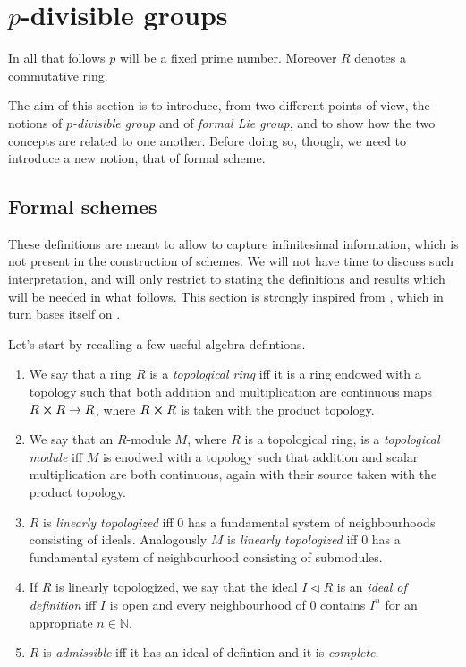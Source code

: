 \documentclass[../Main]{subfiles}
\begin{document}
\section{\texorpdfstring{$p$}{p}-divisible groups}
In all that follows $p$ will be a fixed prime number.
Moreover $R$ denotes a commutative ring.

The aim of this section is to introduce, from two different points of view,
the notions of {\em $p$-divisible group} and of {\em formal Lie group},
and to show how the two concepts are related to one another.
Before doing so, though, we need to introduce a new notion, that
of formal scheme.


\subsection{Formal schemes}
These definitions are meant to allow to capture infinitesimal
information, which is not present in the construction of schemes.
We will not have time to discuss such interpretation, and will
only restrict to stating the definitions and results which will
be needed in what follows.
This section is strongly inspired from 
\cite[\href{https://stacks.math.columbia.edu/tag/0AHY}{Section 0AHY}]{SP},
which in turn bases itself on \cite[\S10]{EGA1}.

Let's start by recalling a few useful algebra defintions.

\begin{defn}\leavevmode\vspace{-1\baselineskip}
\begin{enumerate}
\item We say that a ring $R$ is a {\em topological ring} iff it is a ring endowed with a topology
	such that both addition and multiplication are continuous maps
	$R \cross R \to R$, where $R \cross R$ is taken with the product topology.

\item We say that an $R$-module $M$, where $R$ is a topological ring,
	is a {\em topological module} iff $M$ is enodwed with a topology such that
	addition and scalar multiplication are both continuous, again with their source
	taken with the product topology.

\item $R$ is {\em linearly topologized} iff $0$ has a fundamental system
	of neighbourhoods consisting of ideals.
	Analogously $M$ is {\em linearly topologized} iff $0$ has a fundamental
	system of neighbourhood consisting of submodules.

\item If $R$ is linearly topologized, we say that the ideal $I \triangleleft R$
	is an {\em ideal of definition} iff $I$ is open and every neighbourhood
	of $0$ contains $I^n$ for an appropriate $n \in \mathbb{N}$.

\item $R$ is {\em admissible} iff it has an ideal of defintion and it is {\em complete}.
\end{enumerate}
\end{defn}
\end{document}
